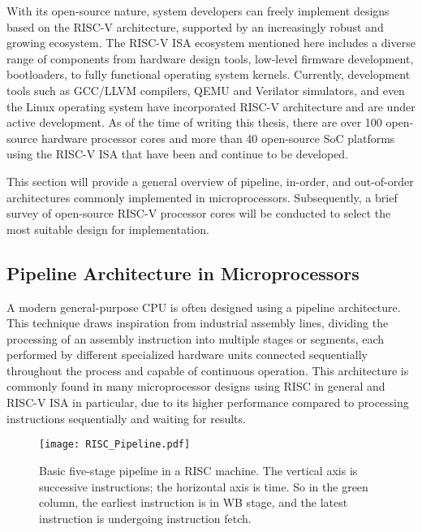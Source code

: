 With its open-source nature, system developers can freely implement designs based on the RISC-V architecture, supported by an increasingly robust and growing ecosystem. The RISC-V ISA ecosystem mentioned here includes a diverse range of components from hardware design tools, low-level firmware development, bootloaders, to fully functional operating system kernels. Currently, development tools such as GCC/LLVM compilers, QEMU and Verilator simulators, and even the Linux operating system have incorporated RISC-V architecture and are under active development. As of the time of writing this thesis, there are over 100 open-source hardware processor cores and more than 40 open-source SoC platforms using the RISC-V ISA that have been and continue to be developed.

This section will provide a general overview of pipeline, in-order, and out-of-order architectures commonly implemented in microprocessors. Subsequently, a brief survey of open-source RISC-V processor cores will be conducted to select the most suitable design for implementation.

\subsection{Pipeline Architecture in Microprocessors}

A modern general-purpose CPU is often designed using a pipeline architecture. This technique draws inspiration from industrial assembly lines, dividing the processing of an assembly instruction into multiple stages or segments, each performed by different specialized hardware units connected sequentially throughout the process and capable of continuous operation. This architecture is commonly found in many microprocessor designs using RISC in general and RISC-V ISA in particular, due to its higher performance compared to processing instructions sequentially and waiting for results.

\begin{figure}[h!]
    \centering
    \texttt{[image: RISC\_Pipeline.pdf]}
    \caption{Basic five-stage pipeline in a RISC machine. The vertical axis is successive instructions; the horizontal axis is time. So in the green column, the earliest instruction is in WB stage, and the latest instruction is undergoing instruction fetch.}
    \label{fig:pipeline_stages}
\end{figure}

